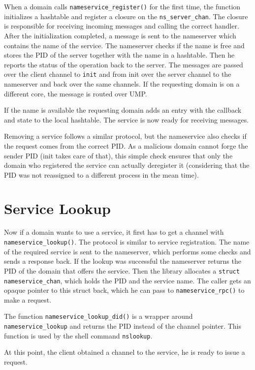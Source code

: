 When a domain calls \verb|nameservice_register()| for the first time, the function initializes a hashtable and register a closure
on the \verb|ns_server_chan|. The closure is responsible for receiving incoming messages and calling the correct handler. After
the initialization completed, a message is sent to the nameserver which contains the name of the service. The nameserver checks
if the name is free and stores the PID of the server together with the name in a hashtable. Then he reports the status of the 
operation back to the server. The messages are passed over the client channel to \verb|init| and from init over the server channel
to the nameserver and back over the same channels. If the requesting domain is on a different core, the message is routed over UMP.

If the name is available the requesting domain adds an entry with the callback and state to the local hashtable. The service is now
ready for receiving messages.

Removing a service follows a similar protocol, but the nameservice also checks if the request comes from the correct PID. As a malicious
domain cannot forge the sender PID (init takes care of that), this simple check ensures that only the domain who registered the service
can actually deregister it (considering that the PID was not reassigned to a different process in the mean time).

\section{Service Lookup}

Now if a domain wants to use a service, it first has to get a channel with \verb|nameservice_lookup()|. The protocol is similar to
service registration. The name of the required service is sent to the nameserver, which performs some checks and sends a response back.
If the lookup was successful the nameserver returns the PID of the domain that offers the service. Then the library allocates a 
\verb|struct nameservice_chan|, which holds the PID and the service name. The caller gets an opaque pointer to this struct back, which
he can pass to \verb|nameservice_rpc()| to make a request.

The function \verb|nameservice_lookup_did()| is a wrapper around \verb|nameservice_lookup| and returns the PID instead of the channel pointer.
This function is used by the shell command \verb|nslookup|.

At this point, the client obtained a channel to the service, he is ready to issue a request.

